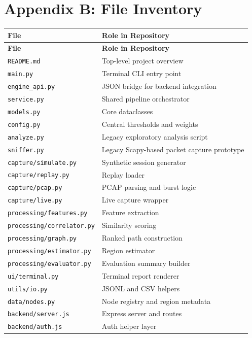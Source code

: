 \documentclass[12pt,a4paper]{report}
\begin{document}
\chapter*{Appendix B: File Inventory}
\begin{longtable}{p{5cm}p{8.5cm}}
\toprule
\textbf{File} & \textbf{Role in Repository} \\
\midrule
\endfirsthead
\toprule
\textbf{File} & \textbf{Role in Repository} \\
\midrule
\endhead
\texttt{README.md} & Top-level project overview \\
\texttt{main.py} & Terminal CLI entry point \\
\texttt{engine\_api.py} & JSON bridge for backend integration \\
\texttt{service.py} & Shared pipeline orchestrator \\
\texttt{models.py} & Core dataclasses \\
\texttt{config.py} & Central thresholds and weights \\
\texttt{analyze.py} & Legacy exploratory analysis script \\
\texttt{sniffer.py} & Legacy Scapy-based packet capture prototype \\
\texttt{capture/simulate.py} & Synthetic session generator \\
\texttt{capture/replay.py} & Replay loader \\
\texttt{capture/pcap.py} & PCAP parsing and burst logic \\
\texttt{capture/live.py} & Live capture wrapper \\
\texttt{processing/features.py} & Feature extraction \\
\texttt{processing/correlator.py} & Similarity scoring \\
\texttt{processing/graph.py} & Ranked path construction \\
\texttt{processing/estimator.py} & Region estimator \\
\texttt{processing/evaluator.py} & Evaluation summary builder \\
\texttt{ui/terminal.py} & Terminal report renderer \\
\texttt{utils/io.py} & JSONL and CSV helpers \\
\texttt{data/nodes.py} & Node registry and region metadata \\
\texttt{backend/server.js} & Express server and routes \\
\texttt{backend/auth.js} & Auth helper layer \\

\end{longtable}
\end{document}
